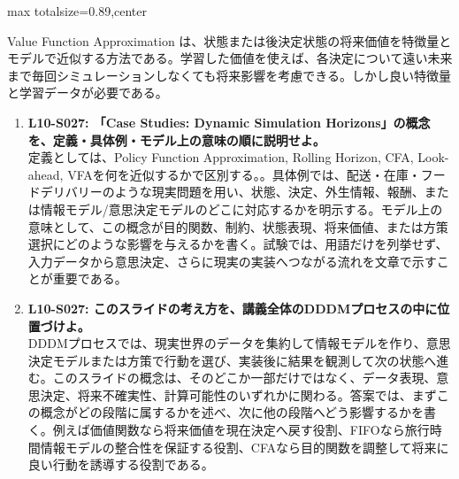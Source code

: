 \begin{minipage}[t]{0.58\textwidth}
\begin{adjustbox}{max totalsize={\textwidth}{0.89\textheight},center}
\begin{minipage}{\textwidth}
Value Function Approximation は、状態または後決定状態の将来価値を特徴量とモデルで近似する方法である。学習した価値を使えば、各決定について遠い未来まで毎回シミュレーションしなくても将来影響を考慮できる。しかし良い特徴量と学習データが必要である。\par{}\begin{enumerate}\item \textbf{L10-S027: 「Case Studies: Dynamic Simulation Horizons」の概念を、定義・具体例・モデル上の意味の順に説明せよ。}\\定義としては、Policy Function Approximation, Rolling Horizon, CFA, Look-ahead, VFAを何を近似するかで区別する。。具体例では、配送・在庫・フードデリバリーのような現実問題を用い、状態、決定、外生情報、報酬、または情報モデル/意思決定モデルのどこに対応するかを明示する。モデル上の意味として、この概念が目的関数、制約、状態表現、将来価値、または方策選択にどのような影響を与えるかを書く。試験では、用語だけを列挙せず、入力データから意思決定、さらに現実の実装へつながる流れを文章で示すことが重要である。\item \textbf{L10-S027: このスライドの考え方を、講義全体のDDDMプロセスの中に位置づけよ。}\\DDDMプロセスでは、現実世界のデータを集約して情報モデルを作り、意思決定モデルまたは方策で行動を選び、実装後に結果を観測して次の状態へ進む。このスライドの概念は、そのどこか一部だけではなく、データ表現、意思決定、将来不確実性、計算可能性のいずれかに関わる。答案では、まずこの概念がどの段階に属するかを述べ、次に他の段階へどう影響するかを書く。例えば価値関数なら将来価値を現在決定へ戻す役割、FIFOなら旅行時間情報モデルの整合性を保証する役割、CFAなら目的関数を調整して将来に良い行動を誘導する役割である。\end{enumerate}
\end{minipage}
\end{adjustbox}
\end{minipage}


